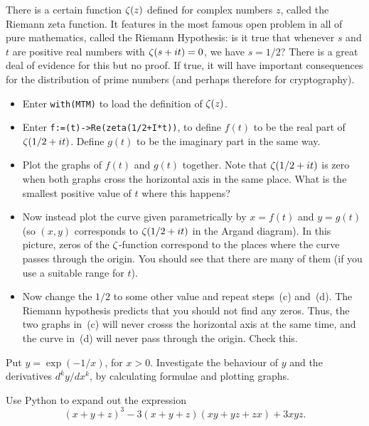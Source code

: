 \documentclass[a4paper,10pt]{amsbook}
\begin{document}
\begin{exercise}
 There is a certain function $\zeta(z)$ defined for complex numbers $z$,
 called the Riemann zeta function.  It features in the most famous
 open problem in all of pure mathematics, called the Riemann
 Hypothesis: is it true that whenever $s$ and $t$ are positive real
 numbers with $\zeta(s+it)=0$, we have $s=1/2$?  There is a great deal
 of evidence for this but no proof.  If true, it will have important
 consequences for the distribution of prime numbers (and perhaps
 therefore for cryptography).

 \begin{itemize}
  \item[(a)] Enter \verb~with(MTM)~ to load the definition of
   $\zeta(z)$.
  \item[(b)] Enter \verb~f:=(t)->Re(zeta(1/2+I*t))~, to
   define $f(t)$ to be the real part of $\zeta(1/2+it)$.  Define $g(t)$ to
   be the imaginary part in the same way.
  \item[(c)] Plot the graphs of $f(t)$ and $g(t)$ together.  Note that
   $\zeta(1/2+it)$ is zero when both graphs cross the horizontal axis in
   the same place.  What is the smallest positive value of $t$ where
   this happens?
  \item[(d)] Now instead plot the curve given parametrically by
   $x=f(t)$ and $y=g(t)$ (so $(x,y)$ corresponds to $\zeta(1/2+it)$ in
   the Argand diagram).  In this picture, zeros of the $\zeta$-function
   correspond to the places where the curve passes through the
   origin.  You should see that there are many of them (if you use a
   suitable range for $t$).
  \item[(e)] Now change the $1/2$ to some other value and repeat
   steps~(c) and~(d).  The Riemann hypothesis predicts that you should
   not find any zeros.  Thus, the two graphs in~(c) will never crosss
   the horizontal axis at the same time, and the curve in~(d) will
   never pass through the origin.  Check this.
 \end{itemize}
\end{exercise}

\begin{exercise}
 Put $y=\exp(-1/x)$, for $x>0$.  Investigate the behaviour of $y$ and
 the derivatives $d^ky/dx^k$, by calculating formulae and plotting
 graphs.  
\end{exercise}

\begin{exercise}\label{ex-expand-symmetric}
 Use Python to expand out the expression
 \[ (x+y+z)^3 - 3(x+y+z)(xy+yz+zx) + 3xyz. \]
\end{exercise}
\end{document}
